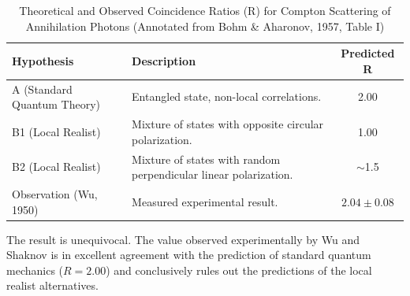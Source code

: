 \begin{table}[h!]
\centering
\caption{Theoretical and Observed Coincidence Ratios (R) for Compton Scattering of Annihilation Photons (Annotated from Bohm \& Aharonov, 1957, Table I)}
\begin{tabular}{|l|l|c|}
\hline
\textbf{Hypothesis} & \textbf{Description} & \textbf{Predicted R} \\
\hline
A (Standard Quantum Theory) & Entangled state, non-local correlations. & 2.00 \\
\hline
B1 (Local Realist) & Mixture of states with opposite circular polarization. & 1.00 \\
\hline
B2 (Local Realist) & Mixture of states with random perpendicular linear polarization. & $\sim$1.5 \\
\hline
Observation (Wu, 1950) & Measured experimental result. & $2.04 \pm 0.08$ \\
\hline
\end{tabular}
\end{table}

The result is unequivocal. The value observed experimentally by Wu and Shaknov is in excellent agreement with the prediction of standard quantum mechanics ($R = 2.00$) and conclusively 
rules out the predictions of the local realist alternatives.
